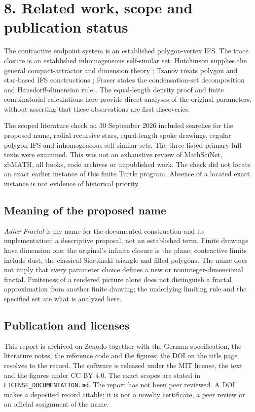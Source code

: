 \documentclass[11pt,a4paper]{article}
\newcommand{\sectiontitle}[1]{\section*{\sffamily\color{ink}#1}}
\begin{document}
\newpage
\sectiontitle{8. Related work, scope and publication status}
The contractive endpoint system is an established polygon-vertex IFS.
The trace closure is an established inhomogeneous self-similar set.
Hutchinson supplies the general compact-attractor and dimension theory
\cite{hutchinson}; Tzanov treats polygon and star-based IFS constructions
\cite{tzanov}; Fraser states the condensation-set decomposition and
Hausdorff-dimension rule \cite{fraser}. The equal-length density proof and
finite combinatorial calculations here provide direct analyses of the
original parameters, without asserting that these observations are first
discoveries.

The scoped literature check on 30 September 2026 included searches for
the proposed name, radial recursive stars, equal-length spoke drawings,
regular polygon IFS and inhomogeneous self-similar sets. The three listed
primary full texts were examined. This was not an exhaustive review of
MathSciNet, zbMATH, all books, code archives or unpublished work. The check
did not locate an exact earlier instance of this finite Turtle program.
Absence of a located exact instance is not evidence of historical priority.

\subsection*{Meaning of the proposed name}
\emph{Adler Fractal} is my name for the documented construction and its
implementation: a descriptive proposal, not an established term. Finite
drawings have dimension one; the original's infinite closure is the plane;
contractive limits include dust, the classical Sierpinski triangle and
filled polygons. The name does not imply that every parameter choice defines
a new or noninteger-dimensional fractal. Finiteness of a rendered picture
alone does not distinguish a fractal approximation from another finite
drawing; the underlying limiting rule and the specified set are what is
analyzed here.

\subsection*{Publication and licenses}
This report is archived on Zenodo together with the German specification,
the literature notes, the reference code and the figures; the DOI on the
title page resolves to the record. The software is released under the MIT
license, the text and the figures under CC BY 4.0. The exact scopes are
stated in \texttt{LICENSE\_DOCUMENTATION.md}. The report has not been peer
reviewed. A DOI makes a deposited record citable; it is not a
novelty certificate, a peer review or an official assignment of the name.
\end{document}

